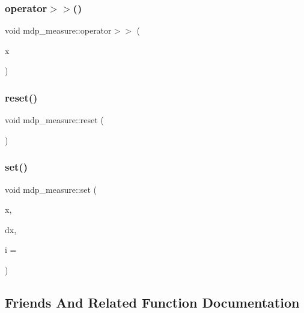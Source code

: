 \subsubsection{\texorpdfstring{operator$>$$>$()}{operator>>()}}
{\footnotesize\ttfamily void mdp\+\_\+measure\+::operator$>$$>$ (\begin{DoxyParamCaption}\item[{float \&}]{x }\end{DoxyParamCaption})\hspace{0.3cm}{\ttfamily [inline]}}

\mbox{\label{classmdp__measure_ae03b11fdcba09eefb70134030b863cf6}} 
\subsubsection{\texorpdfstring{reset()}{reset()}}
{\footnotesize\ttfamily void mdp\+\_\+measure\+::reset (\begin{DoxyParamCaption}{ }\end{DoxyParamCaption})\hspace{0.3cm}{\ttfamily [inline]}}

\mbox{\label{classmdp__measure_a5f6d47b2303eea323f511019404621a2}} 
\subsubsection{\texorpdfstring{set()}{set()}}
{\footnotesize\ttfamily void mdp\+\_\+measure\+::set (\begin{DoxyParamCaption}\item[{float}]{x,  }\item[{float}]{dx,  }\item[{int}]{i = {} }\end{DoxyParamCaption})\hspace{0.3cm}{\ttfamily [inline]}}



\subsection{Friends And Related Function Documentation}
\mbox{\label{classmdp__measure_af1f3876a19982932b4c6a1011f049350}} 
